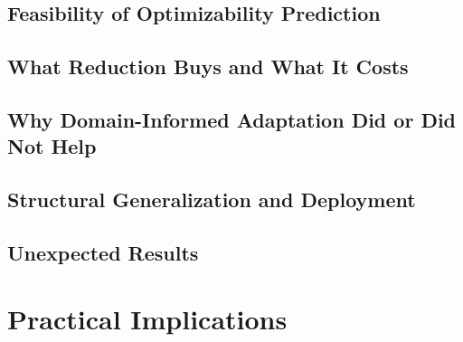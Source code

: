 \subsection{Feasibility of Optimizability Prediction}
\label{sec:discussion:interpretation:feasibility}

\subsection{What Reduction Buys and What It Costs}
\label{sec:discussion:interpretation:tradeoff}

\subsection{Why Domain-Informed Adaptation Did or Did Not Help}
\label{sec:discussion:interpretation:domain}

\subsection{Structural Generalization and Deployment}
\label{sec:discussion:interpretation:generalization}

\subsection{Unexpected Results}
\label{sec:discussion:interpretation:unexpected}


\section{Practical Implications}
\label{sec:discussion:implications}



